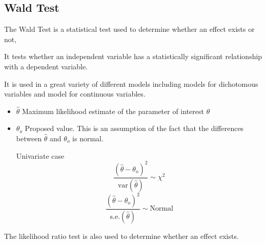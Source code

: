 \documentclass[a4paper,12pt]{article}
\begin{document}
\subsection*{Wald Test}

The Wald Test is a statistical test used to determine whether an effect exists or not,

It tests whether an independent variable has a statistically significant relationship with a dependent variable.

It is used in a great variety of different models including models for dichotomous variables and model for continuous
variables.

\begin{itemize}
	\item $\hat{\theta}$ Maximum likelihood estimate of the parameter of interest $\theta$
	\item $\theta_o$ Proposed value.
	This is an assumption of the fact that the differences between $\hat{\theta}$ and $\theta_o$ is normal.
	
	Univariate case
	\[ \frac{(\hat{\theta} - \theta_o )^2}{\mbox{var}(\hat{\theta})} \sim \chi^2 \]
	\[ \frac{(\hat{\theta} - \theta_o )^2}{\mbox{s.e.}(\hat{\theta})} \sim \mbox{Normal} \]
\end{itemize}	
The likelihood ratio test is also used to determine whether an effect exists.


\end{document}
